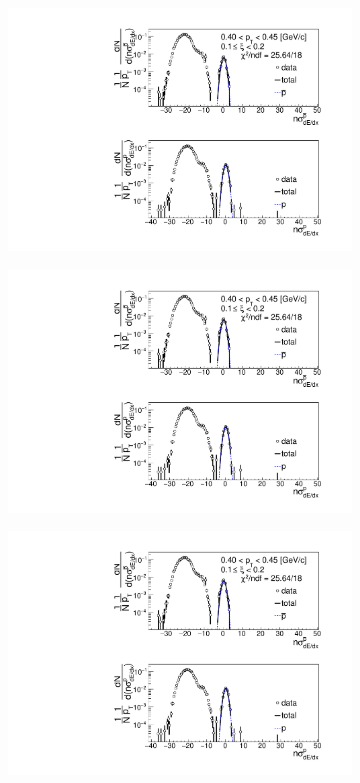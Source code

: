 \begin{figure}[h!]
	\centering
	\begin{subfigure}{.32\textwidth}
		\includegraphics[width=\linewidth, page=1]{chapters/chrgSTAR/img/dEdx/fit2019_thirdStep_2_2.pdf}
	\end{subfigure}
	\begin{subfigure}{.32\textwidth}
		\includegraphics[width=\linewidth, page=2]{chapters/chrgSTAR/img/dEdx/fit2019_thirdStep_2_2.pdf}
	\end{subfigure}
	\begin{subfigure}{.32\textwidth}
		\includegraphics[width=\linewidth, page=3]{chapters/chrgSTAR/img/dEdx/fit2019_thirdStep_2_2.pdf}

\end{subfigure}
\end{figure}
